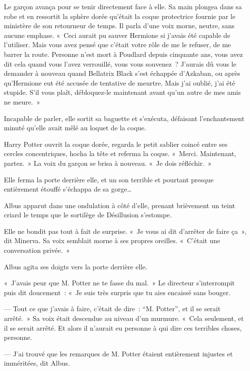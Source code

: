 Le garçon avança pour se tenir directement face à elle. Sa main plongea dans sa robe et en ressortit la sphère dorée qu'était la coque protectrice fournie par le ministère de son retourneur de temps. Il parla d'une voix morne, neutre, sans aucune emphase. «~Ceci aurait pu sauver Hermione si j'avais été capable de l'utiliser. Mais vous avez pensé que c'était votre rôle de me le refuser, de me barrer la route. Personne n'est mort à Poudlard depuis cinquante ans, vous avez dit cela quand vous l'avez verrouillé, vous vous souvenez~? J'aurais dû vous le demander à nouveau quand Bellatrix Black s'est échappée d'Azkaban, ou après qu'Hermione eut été accusée de tentative de meurtre. Mais j'ai oublié, j'ai été stupide. S'il vous plaît, débloquez-le maintenant avant qu'un autre de mes amis ne meure.~»

Incapable de parler, elle sortit sa baguette et s'exécuta, défaisant l'enchantement minuté qu'elle avait mêlé au loquet de la coque.

Harry Potter ouvrit la coque dorée, regarda le petit sablier coincé entre ses cercles concentriques, hocha la tête et referma la coque. «~Merci. Maintenant, partez.~» La voix du garçon se brisa à nouveau. «~Je dois réfléchir.~»

\later

Elle ferma la porte derrière elle, et un son terrible et pourtant presque entièrement étouffé s'échappa de sa gorge…

Albus apparut dans une ondulation à côté d'elle, prenant brièvement un teint criard le temps que le sortilège de Désillusion s'estompe.

Elle ne bondit pas tout à fait de surprise. «~Je vous ai dit d'arrêter de faire ça~», dit Minerva. Sa voix semblait morne à ses propres oreilles. «~C'était une conversation privée.~»

Albus agita ses doigts vers la porte derrière elle.

«~J'avais peur que M. Potter ne te fasse du mal.~» Le directeur s'interrompit puis dit doucement~: «~Je suis très surpris que tu aies encaissé sans bouger.

--- Tout ce que j'avais à faire, c'était de dire~: “M. Potter”, et il se serait arrêté.~» Sa voix était descendue au niveau d'un murmure. «~Cela seulement, et il se serait arrêté. Et alors il n'aurait eu personne à qui dire ces terribles choses, personne.

--- J'ai trouvé que les remarques de M. Potter étaient entièrement injustes et imméritées, dit Albus.

